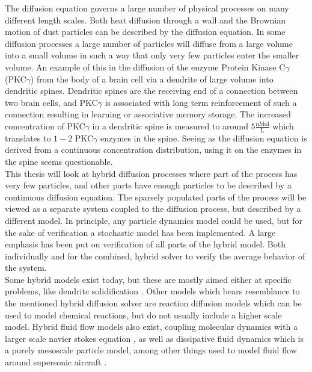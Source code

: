 The diffusion equation governs a large number of physical processes on many different length scales. 
Both heat diffusion through a wall and the Brownian motion of dust particles can be described by the diffusion equation. 
In some diffusion processes a large number of particles will diffuse from a large volume into a small volume in such a way that only very few particles enter the smaller volume. 
An example of this in the diffusion of the enzyme Protein Kinase C$\gamma$ (PKC$\gamma$) from the body of a brain cell via a dendrite of large volume into dendritic spines. 
Dendritic spines are the receiving end of a connection between two brain cells, and PKC$\gamma$ is associated with long term reinforcement of such a connection resulting in learning or associative memory storage. 
The increased concentration of PKC$\gamma$ in a dendritic spine is measured to around $5\frac{\text{nMol}}{\text{L}}$ which translates to $1-2$ PKC$\gamma$ enzymes in the spine. 
Seeing as the diffusion equation is derived from a continuous concentration distribution, using it on the enzymes in the spine seems questionable. \\

This thesis will look at hybrid diffusion processes where part of the process has very few particles, and other parts have enough particles to be described by a continuous diffusion equation. 
The sparsely populated parts of the process will be viewed as a separate system coupled to the diffusion process, but described by a different model. 
In principle, any particle dynamics model could be used, but for the sake of verification a stochastic model has been implemented. 
A large emphasis has been put on verification of all parts of the hybrid model. 
Both individually and for the combined, hybrid solver to verify the average behavior of the system. \\

Some hybrid models exist today, but these are mostly aimed either at specific problems, like dendritc solidification \cite{plapp2000multiscale}. 
Other models which bears resemblance to the mentioned hybrid diffusion solver are reaction diffusion models \cite{hattne2005stochastic} which can be used to model chemical reactions, but do not usually include a higher scale model. 
Hybrid fluid flow models also exist, coupling molecular dynamics with a larger scale navier stokes equation \cite{o1995molecular}, as well as dissipative fluid dynamics which is a purely mesoscale particle model, among other things used to model fluid flow around supersonic aircraft \cite{}. 

